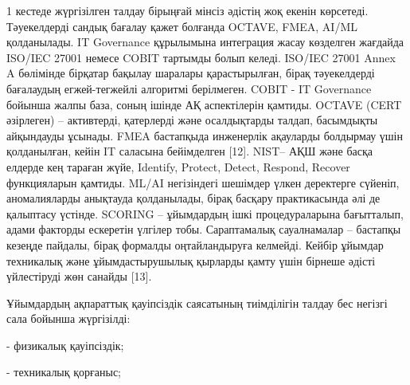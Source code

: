 
1 кестеде жүргізілген талдау бірыңғай мінсіз әдістің жоқ екенін
көрсетеді. Тәуекелдерді сандық бағалау қажет болғанда OCTAVE, FMEA,
AI/ML қолданылады. IT Governance құрылымына интеграция жасау көзделген
жағдайда ISO/IEC 27001 немесе COBIT тартымды болып келеді. ISO/IEC 27001
Annex A бөлімінде бірқатар бақылау шаралары қарастырылған, бірақ
тәуекелдерді бағалаудың егжей-тегжейлі алгоритмі берілмеген. COBIT - IT
Governance бойынша жалпы база, соның ішінде АҚ аспектілерін қамтиды.
OCTAVE (CERT әзірлеген) -- активтерді, қатерлерді және осалдықтарды
талдап, басымдықты айқындауды ұсынады. FMEA бастапқыда инженерлік
ақауларды болдырмау үшін қолданылған, кейін IT саласына бейімделген
{[}12{]}. NIST-- АҚШ және басқа елдерде кең тараған жүйе, Identify,
Protect, Detect, Respond, Recover функцияларын қамтиды. ML/AI
негізіндегі шешімдер үлкен деректерге сүйеніп, аномалияларды анықтауда
қолданылады, бірақ басқару практикасында әлі де қалыптасу үстінде.
SCORING -- ұйымдардың ішкі процедураларына бағытталып, адами факторды
ескеретін үлгілер тобы. Сараптамалық сауалнамалар -- бастапқы кезеңде
пайдалы, бірақ формалды оңтайландыруға келмейді. Кейбір ұйымдар
техникалық және ұйымдастырушылық қырларды қамту үшін бірнеше әдісті
үйлестіруді жөн санайды {[}13{]}.

Ұйымдардың ақпараттық қауіпсіздік саясатының тиімділігін талдау бес
негізгі сала бойынша жүргізілді:


- физикалық қауіпсіздік;

- техникалық қорғаныс;

